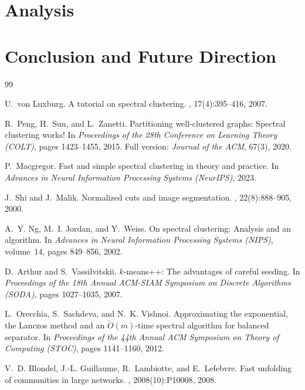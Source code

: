 \documentclass{article}
\theoremstyle{definition}
\theoremstyle{remark}
\begin{document}
\section{Analysis}

\section{Conclusion and Future Direction}


\begin{thebibliography}{99}

U.~von Luxburg.
\newblock A tutorial on spectral clustering.
, 17(4):395--416, 2007.

R.~Peng, H.~Sun, and L.~Zanetti.
\newblock Partitioning well-clustered graphs: Spectral clustering works!
\newblock In {\em Proceedings of the 28th Conference on Learning Theory (COLT)},
  pages 1423--1455, 2015.
\newblock Full version: {\em Journal of the ACM}, 67(3), 2020.

P.~Macgregor.
\newblock Fast and simple spectral clustering in theory and practice.
\newblock In {\em Advances in Neural Information Processing Systems (NeurIPS)},
  2023.

J.~Shi and J.~Malik.
\newblock Normalized cuts and image segmentation.
,
  22(8):888--905, 2000.

A.~Y. Ng, M.~I. Jordan, and Y.~Weiss.
\newblock On spectral clustering: Analysis and an algorithm.
\newblock In {\em Advances in Neural Information Processing Systems (NIPS)},
  volume~14, pages 849--856, 2002.

D.~Arthur and S.~Vassilvitskii.
\newblock $k$-means++: The advantages of careful seeding.
\newblock In {\em Proceedings of the 18th Annual ACM-SIAM Symposium on Discrete
  Algorithms (SODA)}, pages 1027--1035, 2007.

L.~Orecchia, S.~Sachdeva, and N.~K. Vishnoi.
\newblock Approximating the exponential, the {L}anczos method and an
  $\tilde{O}(m)$-time spectral algorithm for balanced separator.
\newblock In {\em Proceedings of the 44th Annual ACM Symposium on Theory of
  Computing (STOC)}, pages 1141--1160, 2012.

V.~D. Blondel, J.-L. Guillaume, R.~Lambiotte, and E.~Lefebvre.
\newblock Fast unfolding of communities in large networks.
,
  2008(10):P10008, 2008.


\end{thebibliography}
\end{document}
